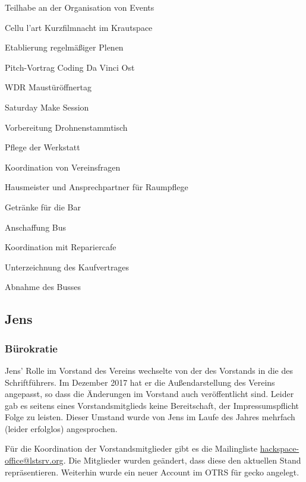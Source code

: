 \documentclass[ngerman]{scrartcl}
\begin{document}
\begin{compactitem}
    \item Teilhabe an der Organisation von Events
    \begin{compactitem}
        \item Cellu l'art Kurzfilmnacht im Krautspace
        \item Etablierung regelmäßiger Plenen
        \item Pitch-Vortrag Coding Da Vinci Ost
        \item WDR Maustüröffnertag
        \item Saturday Make Session
        \item Vorbereitung Drohnenstammtisch
    \end{compactitem}
    \item Pflege der Werkstatt
    \item Koordination von Vereinsfragen
    \item Hausmeister und Ansprechpartner für Raumpflege
    \item Getränke für die Bar
    \item Anschaffung Bus 
    \begin{compactitem}
        \item Koordination mit Repariercafe
        \item Unterzeichnung des Kaufvertrages
        \item Abnahme des Busses
    \end{compactitem}
\end{compactitem}

\subsection{Jens}

\subsubsection{Bürokratie}


Jens' Rolle im Vorstand des Vereins wechselte von der des Vorstands in die des
Schriftführers. Im Dezember 2017 hat er die Außendarstellung des Vereins
angepasst, so dass die Änderungen im Vorstand auch veröffentlicht sind. Leider
gab es seitens eines Vorstandsmitglieds keine Bereitschaft, der
Impressumspflicht Folge zu leisten. Dieser Umstand wurde von Jens im Laufe des
Jahres mehrfach (leider erfolglos) angesprochen.

Für die Koordination der Vorstandsmitglieder gibt es die Mailingliste
\href{https://lstsrv.org/mailman/listinfo/hackspace-office}{hackspace-office@lstsrv.org}. Die
Mitglieder wurden geändert, dass diese den aktuellen Stand
repräsentieren. Weiterhin wurde ein neuer Account im OTRS für gecko angelegt.
\end{document}
